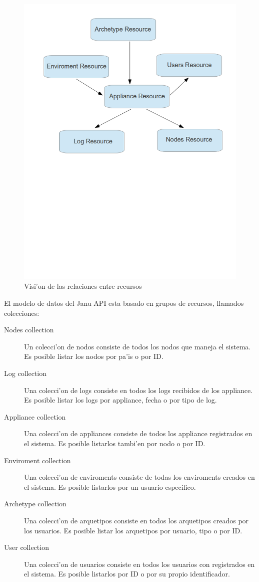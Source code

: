 \begin{figure}[hbp]
 \centering
 \includegraphics[scale=0.44]{fig/RelationshipsBetweenResources}
 \caption{Visi'on de las relaciones entre recursos}
 \label{fig:caption-bottom}
\end{figure}

El modelo de datos del Janu API esta basado en grupos de recursos, llamados colecciones:

\begin{description}
\item [Nodes collection] Un colecci'on de nodos consiste de todos los nodos que maneja el sistema. Es posible listar los nodos por pa'is o por ID.
\item [Log collection] Una colecci'on de logs consiste en todos los logs recibidos de los appliance. Es posible listar los logs por appliance, fecha o por tipo de log.
\item [Appliance collection] Una colecci'on de appliances consiste de todos los appliance registrados en el sistema. Es posible listarlos tambi'en por nodo o por ID.
\item [Enviroment collection] Una colecci'on de enviroments consiste de todas los enviroments creados en el sistema. Es posible listarlos por un usuario especifico.
\item [Archetype collection] Una colecci'on de arquetipos consiste en todos los arquetipos creados por los usuarios. Es posible listar los arquetipos por usuario, tipo o por ID.
\item [User collection] Una colecci'on de usuarios consiste en todos los usuarios con registrados en el sistema. Es posible listarlos por ID o por su propio identificador.
\end{description}

